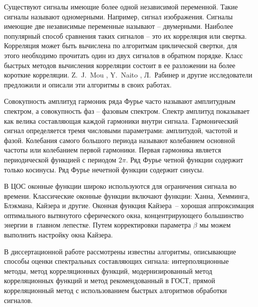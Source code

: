 Существуют сигналы имеющие более одной независимой переменной. Такие сигналы называют одномерными. Например, сигнал изображения. Сигналы имеющие две независимые переменные называют -- двумерными.
Наиболее популярный способ сравнения таких сигналов – это их корреляция или свертка. Корреляция может быть вычислена по алгоритмам циклической свертки, для этого необходимо прочитать один из двух сигналов в обратном порядке. Класс быстрых методов вычисления корреляции состоит в ее разложении на более короткие корреляции. Z.~J.~Mou \cite{MOU1987377}, Y.~Naito \cite{550562}, Л.~Рабинер \cite{Rabiner1978theory} и другие исследователи предложили и описали эти алгоритмы в своих работах.



Совокупность амплитуд гармоник ряда Фурье часто называют амплитудным спектром, а совокупность фаз -- фазовым спектром. Спектр амплитуд показывает как велика составляющая каждой гармоники внутри сигнала. Гармонический сигнал определяется тремя числовыми параметрами: амплитудой, частотой и фазой. Колебания самого большого периода называют колебанием основной частоты или колебанием первой гармоники. Первая гармоника является периодической функцией с периодом $2 \pi$. Ряд Фурье четной функции содержит только косинусы. Ряд Фурье нечетной функции содержит синусы.

В ЦОС оконные функции широко используются для ограничения сигнала во времени. Классические оконные функции включают функции: Ханна, Хемминга, Блэкмана, Кайзера и другие. Оконная функция Кайзера – хорошая аппроксимация оптимального вытянутого сферического окна, концентрирующего большинство энергии в главном лепестке.
Путем корректировки параметра $\beta$ мы можем выполнить настройку окна
Кайзера.

В диссертационной работе рассмотрены известны алгоритмы, описывающие способы оценки спектральных составляющих сигнала: интерполяционные методы, метод корреляционных функций, модернизированный метод корреляционных функций и метод рекомендованный в ГОСТ, прямой корреляционный метод с использованием быстрых алгоритмов обработки сигналов. 

